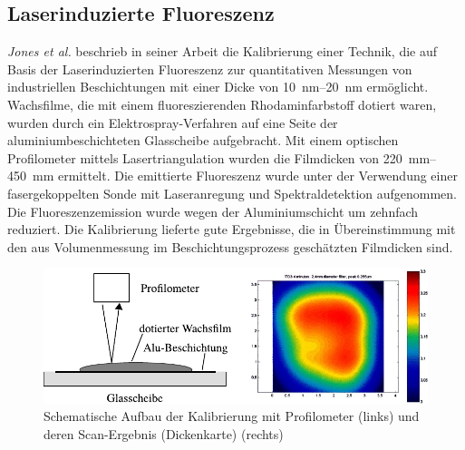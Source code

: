 \subsection{Laserinduzierte Fluoreszenz}
\label{sub:laserinduzierte_fluoreszenz}

\textit{Jones et al.} beschrieb in seiner Arbeit \cite{jones_2001} die Kalibrierung einer Technik, die auf Basis der Laserinduzierten Fluoreszenz zur quantitativen Messungen von industriellen Beschichtungen mit einer Dicke von \SIrange{10}{20}{\nano\meter} ermöglicht.
Wachsfilme, die mit einem fluoreszierenden Rhodaminfarbstoff dotiert waren, wurden durch ein Elektrospray-Verfahren auf eine Seite der aluminiumbeschichteten Glasscheibe aufgebracht.
Mit einem optischen Profilometer mittels Lasertriangulation wurden die Filmdicken von \SIrange{220}{450}{\milli\meter} ermittelt.
Die emittierte Fluoreszenz wurde unter der Verwendung einer fasergekoppelten Sonde mit Laseranregung und Spektraldetektion aufgenommen.
Die Fluoreszenzemission wurde wegen der Aluminiumschicht um zehnfach reduziert.
Die Kalibrierung lieferte gute Ergebnisse, die in Übereinstimmung mit den aus Volumenmessung im Beschichtungsprozess geschätzten Filmdicken sind.
\begin{figure}[htb]
    \centering
    \includegraphics[]{./images/schematic_profilometer_and_scan_result_jones.pdf}
    \caption{Schematische Aufbau der Kalibrierung mit Profilometer (links) und deren Scan-Ergebnis (Dickenkarte) (rechts) \cite{jones_2001}}
    \label{fig:aufbau_laserinduzierte_kalibrierung_jones}
\end{figure}
%
